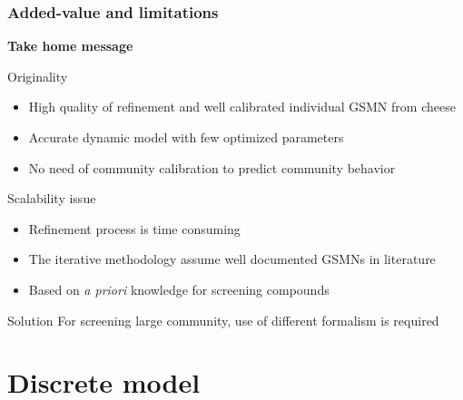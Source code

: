 \documentclass[8pt]{beamer}
\begin{document}
\begin{frame}
\frametitle{Added-value and limitations}
\centering
\textbf{\huge Take home message}

\begin{minipage}{0.45\textwidth}
\begin{block}{Originality}
\begin{itemize}
\item High quality of refinement and well calibrated individual GSMN from cheese %
\item Accurate dynamic model with few optimized parameters %
\item No need of community calibration to predict community behavior %
\end{itemize}
\end{block} %
\end{minipage}\hfill
\hspace{0.5cm}
\hfill
\begin{minipage}{0.45\textwidth}
\begin{block}{Scalability issue}
\begin{itemize}
\item Refinement process is time consuming
\item The iterative methodology assume well documented GSMNs in literature
\item Based on \textit{a priori} knowledge for screening compounds
\end{itemize}
\end{block}
\end{minipage}

\begin{block}{Solution}
For screening large community, use of different formalism is required
\end{block}


\end{frame}



\section{Discrete model}
\end{document}
